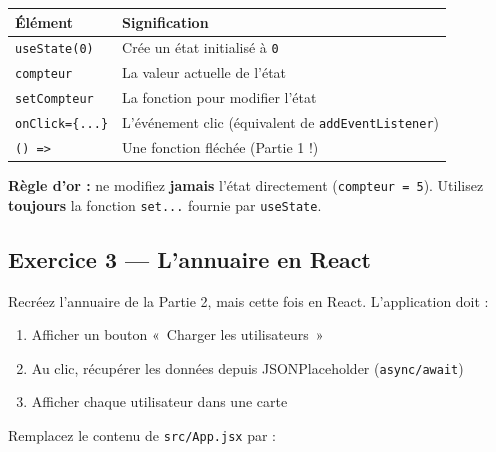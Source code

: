 \documentclass[11pt,a4paper]{article}
\begin{document}
\begin{retenirbox}
\begin{center}
\begin{tabular}{lp{8cm}}
\toprule
\textbf{Élément} & \textbf{Signification} \\
\midrule
\texttt{useState(0)} & Crée un état initialisé à \texttt{0} \\
\texttt{compteur} & La valeur actuelle de l'état \\
\texttt{setCompteur} & La fonction pour modifier l'état \\
\texttt{onClick=\{...\}} & L'événement clic (équivalent de \texttt{addEventListener}) \\
\texttt{() =>} & Une fonction fléchée (Partie 1 !) \\
\bottomrule
\end{tabular}
\end{center}
\textbf{Règle d'or :} ne modifiez \textbf{jamais} l'état directement (\texttt{compteur = 5}). Utilisez \textbf{toujours} la fonction \texttt{set...} fournie par \texttt{useState}.
\end{retenirbox}

\subsection{Exercice 3 --- L'annuaire en React}

\begin{objectifbox}
Recréez l'annuaire de la Partie 2, mais cette fois en React. L'application doit :
\begin{enumerate}[nosep]
    \item Afficher un bouton «~Charger les utilisateurs~»
    \item Au clic, récupérer les données depuis JSONPlaceholder (\texttt{async/await})
    \item Afficher chaque utilisateur dans une carte
\end{enumerate}
\end{objectifbox}

Remplacez le contenu de \texttt{src/App.jsx} par :
\end{document}
